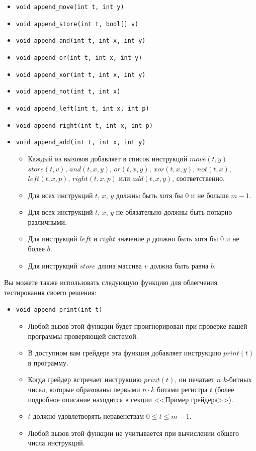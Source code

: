 \begin{itemize}
\item \texttt{void append\_move(int t, int y)}
\item \texttt{void append\_store(int t, bool[] v)}
\item \texttt{void append\_and(int t, int x, int y)}
\item \texttt{void append\_or(int t, int x, int y)}
\item \texttt{void append\_xor(int t, int x, int y)}
\item \texttt{void append\_not(int t, int x)}
\item \texttt{void append\_left(int t, int x, int p)}
\item \texttt{void append\_right(int t, int x, int p)}
\item \texttt{void append\_add(int t, int x, int y)}
\begin{itemize}
\item Каждый из вызовов добавляет в список инструкций $move(t,y)$ $store(t,v)$, $and(t,x,y)$, $or(t,x,y)$, $xor(t,x,y)$, $not(t,x)$, $left(t,x,p)$, $right(t,x,p)$ или $add(t,x,y)$, соответственно.
\item Для всех инструкций $t$, $x$, $y$ должны быть хотя бы $0$ и не больше $m-1$.
\item Для всех инструкций $t$, $x$, $y$ не обязательно должны быть попарно различными.
\item Для инструкций $left$ и $right$ значение $p$ должно быть хотя бы $0$ и не более $b$.
\item Для инструкций $store$ длина массива $v$ должна быть равна $b$.
\end{itemize}
\end{itemize}

Вы можете также использовать следующую функцию для облегчения тестирования своего решения:

\begin{itemize}
\item \texttt{void append\_print(int t)}
\begin{itemize}
\item Любой вызов этой функции будет проигнорирован при проверке вашей программы проверяющей системой.
\item В доступном вам грейдере эта функция добавляет инструкцию $print(t)$ в программу.
\item Когда грейдер встречает инструкцию $print(t)$, он печатает $n$ $k$-битных чисел, которые образованы первыми $n \cdot k$ битами регистра $t$ (более подробное описание находится в секции <<Пример грейдера>>).
\item $t$ должно удовлетворять неравенствам $0 \leq t \leq m-1$.
\item Любой вызов этой функции не учитывается при вычислении общего числа инструкций.
\end{itemize}
\end{itemize}

